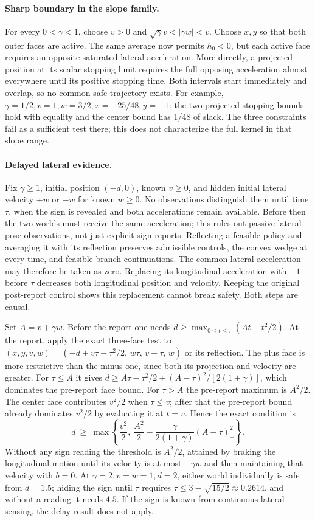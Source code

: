 \documentclass[11pt]{article}
\begin{document}
\paragraph{Sharp boundary in the slope family.}
For every \(0<\gamma<1\), choose \(v>0\) and \(\sqrt{\gamma}v<|\gamma w|<v\). Choose \(x,y\) so that both outer faces are active. The same average now permits \(h_0<0\), but each active face requires an opposite saturated lateral acceleration. More directly, a projected position at its scalar stopping limit requires the full opposing acceleration almost everywhere until its positive stopping time. Both intervals start immediately and overlap, so no common safe trajectory exists. For example, \(\gamma=1/2,v=1,w=3/2,x=-25/48,y=-1\): the two projected stopping bounds hold with equality and the center bound has 1/48 of slack. The three constraints fail as a sufficient test there; this does not characterize the full kernel in that slope range.
\paragraph{Delayed lateral evidence.}
Fix \(\gamma\geq1\), initial position \((-d,0)\), known \(v\geq0\), and hidden initial lateral velocity \(+w\) or \(-w\) for known \(w\geq0\). No observations distinguish them until time \(\tau\), when the sign is revealed and both accelerations remain available. Before then the two worlds must receive the same acceleration; this rules out passive lateral pose observations, not just explicit sign reports. Reflecting a feasible policy and averaging it with its reflection preserves admissible controls, the convex wedge at every time, and feasible branch continuations. The common lateral acceleration may therefore be taken as zero. Replacing its longitudinal acceleration with \(-1\) before \(\tau\) decreases both longitudinal position and velocity. Keeping the original post-report control shows this replacement cannot break safety. Both steps are causal.
\par
Set \(A=v+\gamma w\). Before the report one needs \(d\geq\max_{0\leq t\leq\tau}(At-t^2/2)\). At the report, apply the exact three-face test to \((x,y,v,w)=(-d+v\tau-\tau^2/2,\,w\tau,\,v-\tau,\,w)\) or its reflection. The plus face is more restrictive than the minus one, since both its projection and velocity are greater. For \(\tau\leq A\) it gives
\(d\geq A\tau-\tau^2/2+(A-\tau)^2/[2(1+\gamma)]\),
which dominates the pre-report face bound. For \(\tau>A\) the pre-report maximum is \(A^2/2\). The center face contributes \(v^2/2\) when \(\tau\leq v\); after that the pre-report bound already dominates \(v^2/2\) by evaluating it at \(t=v\). Hence the exact condition is
\[
 d\ \geq\ \max\left\{\frac{v^2}{2},\ \frac{A^2}{2}-\frac{\gamma}{2(1+\gamma)}(A-\tau)_+^2\right\}.
\]
Without any sign reading the threshold is \(A^2/2\), attained by braking the longitudinal motion until its velocity is at most \(-\gamma w\) and then maintaining that velocity with \(b=0\). At \(\gamma=2,v=w=1,d=2\), either world individually is safe from \(d=1.5\); hiding the sign until \(\tau\) requires \(\tau\leq3-\sqrt{15/2}\approx0.2614\), and without a reading it needs \(4.5\). If the sign is known from continuous lateral sensing, the delay result does not apply.
\end{document}
